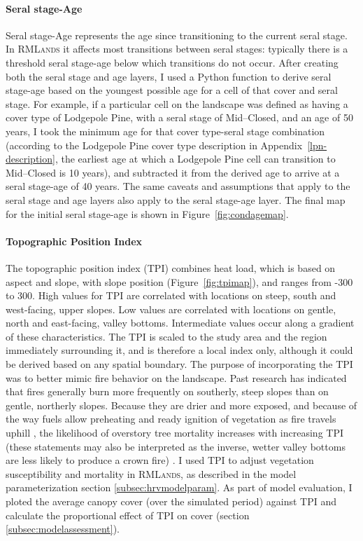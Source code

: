 \paragraph*{Seral stage-Age}
Seral stage-Age represents the age since transitioning to the current seral stage. In \textsc{RMLands} it affects most transitions between seral stages: typically there is a threshold seral stage-age below which transitions do not occur. After creating both the seral stage and age layers, I used a Python function to derive seral stage-age based on the youngest possible age for a cell of that cover and seral stage. For example, if a particular cell on the landscape was defined as having a cover type of Lodgepole Pine, with a seral stage of Mid--Closed, and an age of 50 years, I took the minimum age for that cover type-seral stage combination (according to the Lodgepole Pine cover type description in Appendix~\ref{lpn-description}, the earliest age at which a Lodgepole Pine cell can transition to Mid--Closed is 10 years), and subtracted it from the derived age to arrive at a seral stage-age of 40 years. The same caveats and assumptions that apply to the seral stage and age layers also apply to the seral stage-age layer. The final map for the initial seral stage-age is shown in Figure~\ref{fig:condagemap}.


\paragraph*{Topographic Position Index}
The topographic position index (TPI) combines heat load, which is based on aspect and slope, with slope position (Figure~\ref{fig:tpimap}), and ranges from -300 to 300. High values for TPI are correlated with locations on steep, south and west-facing, upper slopes. Low values are correlated with locations on gentle, north and east-facing, valley bottoms. Intermediate values occur along a gradient of these characteristics. The TPI is scaled to the study area and the region immediately surrounding it, and is therefore a local index only, although it could be derived based on any spatial boundary. The purpose of incorporating the TPI was to better mimic fire behavior on the landscape. Past research has indicated that fires generally burn more frequently on southerly, steep slopes than on gentle, northerly slopes. Because they are drier and more exposed, and because of the way fuels allow preheating and ready ignition of vegetation as fire travels uphill \citep{Rothermel1983}, the likelihood of overstory tree mortality increases with increasing TPI (these statements may also be interpreted as the inverse, wetter valley bottoms are less likely to produce a crown fire) \citep{North2012,Taylor2003a}. I used TPI to adjust vegetation susceptibility and mortality in \textsc{RMLands}, as described in the model parameterization section \ref{subsec:hrvmodelparam}. As part of model evaluation, I ploted the average canopy cover (over the simulated period) against TPI and calculate the proportional effect of TPI on cover (section \ref{subsec:modelassessment}).



